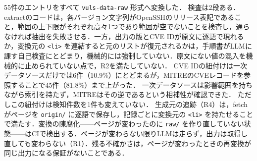 55件のエントリをすべて \texttt{vuls-data-raw} 形式へ変換した\cite{vdu-pr928}．
検査は2段ある．extractのコードは，各バージョン文字列がOpenSSHのリリース表記であること，範囲の上下限がそれぞれ高々1つであり範囲が空でないことを検査し，通らなければ抽出を失敗させる．一方，出力の版とCVE IDが原文に逐語で現れるか，変換元の \texttt{<li>} を連結すると元のリストが復元されるかは，手順書がLLMに課す自己検査にとどまり，機械的には強制していない．原文にない値の混入を機械的に止められていない点で，R2を満たしていない．
CVE IDの紐付けは一次データソースだけでは6件（10.9\%）にとどまるが，MITREのCVEレコードを参照することで45件（81.8\%）まで上がった．
一次データソースは影響範囲を持ちながら索引を持たず，MITREはその逆であるという相補性が確認できた．
ただしこの紐付けは検知件数を1件も変えていない．
生成元の追跡（R4）は，fetchがページを \texttt{origin/} に逐語で保存し，記録ごとに変換元の \texttt{<li>} を持たせることで満たす．変換の陳腐化——ページが変わったのに \texttt{raw/} を作り直していない状態——はCIで検出する\cite{vdb-pr224}．ページが変わらない限りLLMは走らず，出力は取得し直しても変わらない（R1）．残る不確かさは，ページが変わったときの再変換が同じ出力になる保証がないことである．
